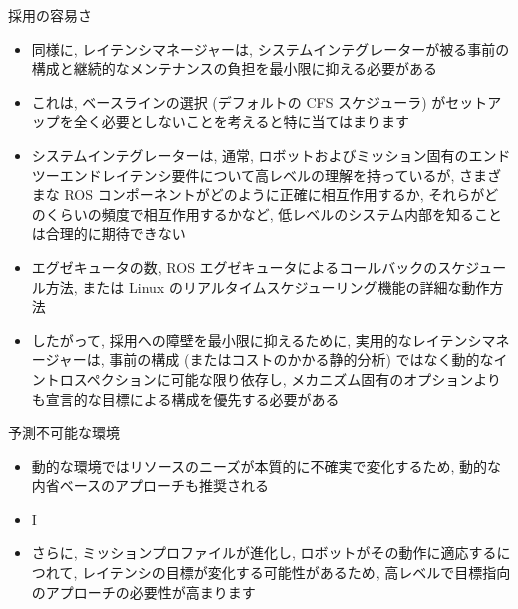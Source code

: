 \begin{frame}{採用の容易さ}
    \begin{itemize}
        \item 同様に, レイテンシマネージャーは, システムインテグレーターが被る事前の構成と継続的なメンテナンスの負担を最小限に抑える必要がある
\item これは, ベースラインの選択 (デフォルトの CFS スケジューラ) がセットアップを全く必要としないことを考えると特に当てはまります
\item システムインテグレーターは, 通常, ロボットおよびミッション固有のエンドツーエンドレイテンシ要件について高レベルの理解を持っているが, さまざまな ROS コンポーネントがどのように正確に相互作用するか, それらがどのくらいの頻度で相互作用するかなど, 低レベルのシステム内部を知ることは合理的に期待できない
    \end{itemize}
\end{frame}

\begin{frame}{}
    \begin{itemize}
        \item エグゼキュータの数, ROS エグゼキュータによるコールバックのスケジュール方法, または Linux のリアルタイムスケジューリング機能の詳細な動作方法
\item したがって, 採用への障壁を最小限に抑えるために, 実用的なレイテンシマネージャーは, 事前の構成 (またはコストのかかる静的分析) ではなく動的なイントロスペクションに可能な限り依存し, メカニズム固有のオプションよりも宣言的な目標による構成を優先する必要がある
    \end{itemize}
\end{frame}

\begin{frame}{予測不可能な環境}
    \begin{itemize}
        \item 動的な環境ではリソースのニーズが本質的に不確実で変化するため, 動的な内省ベースのアプローチも推奨される
\item I
\item さらに, ミッションプロファイルが進化し, ロボットがその動作に適応するにつれて, レイテンシの目標が変化する可能性があるため, 高レベルで目標指向のアプローチの必要性が高まります
    \end{itemize}
\end{frame}


